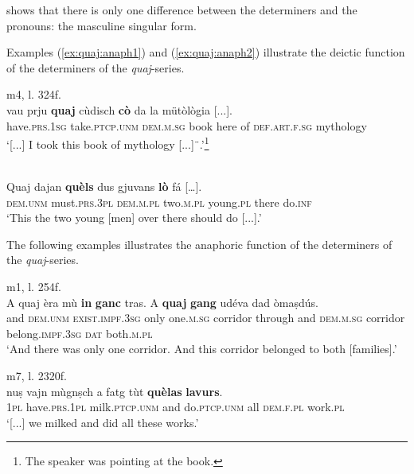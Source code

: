  shows that there is only one difference between the determiners and the pronouns: the masculine singular form. 


Examples (\ref{ex:quaj:anaph1}) and (\ref{ex:quaj:anaph2}) illustrate the deictic function of the determiners of the \textit{quaj}-series.

\ea
\label{ex:quaj:anaph1}
 {m4, l. 324f.}\\
\gll [...] vau prju \textbf{quaj} cùdisch \textbf{cò} da la mütòlògia [...].\\
{} have.\textsc{prs.1sg} take.\textsc{ptcp.unm} \textsc{dem.m.sg} book here of \textsc{def.art.f.sg} mythology\\
\glt `[...] I took this book of mythology [...]¨.'\footnote{The speaker was pointing at the book.}
\z

\ea
\label{ex:quaj:anaph2}
\\
\gll Quaj dajan \textbf{quèls} dus gjuvans \textbf{lò} fá […].\\
    \textsc{dem.unm} must.\textsc{prs.3pl} \textsc{dem.m.pl} two.\textsc{m.pl} young.\textsc{pl} there do.\textsc{inf}\\
\glt `This the two young [men] over there should do [...].'
\z

The following examples illustrates the anaphoric function of the determiners of the \textit{quaj}-series.

\ea

 {m1, l. 254f.}\\
\gll A quaj èra mù \textbf{in} \textbf{ganc} tras. A \textbf{quaj} \textbf{gang} udéva dad òmaṣdús.\\
and \textsc{dem.unm} \textsc{exist.impf.3sg} only one.\textsc{m.sg} corridor through and \textsc{dem.m.sg} corridor belong.\textsc{impf.3sg} \textsc{dat} both.\textsc{m.pl}\\
\glt ‘And there was only one corridor. And this corridor belonged to both [families].’
\z

\ea

 {m7, l. 2320f.}\\
\gll [...] nuṣ vajn mùgnṣch a fatg tùt \textbf{quèlas} \textbf{lavurs}.\\
{} \textsc{1pl} have.\textsc{prs.1pl} milk.\textsc{ptcp.unm} and do.\textsc{ptcp.unm} all \textsc{dem.f.pl} work.\textsc{pl}\\
\glt `[...] we milked and did all these works.'
\z

